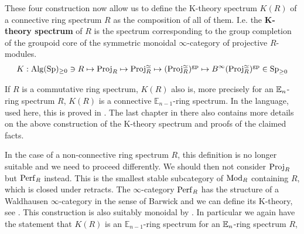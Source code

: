 These four construction now allow us to define the K-theory spectrum $K(R)$ of a connective ring spectrum $R$ as the composition of all of them. I.e. the \textbf{K-theory spectrum} of $R$ is the spectrum corresponding to the group completion of the groupoid core of the symmetric monoidal $\infty$-category of projective $R$-modules. 
\begin{align*}
        K: \operatorname{Alg}(\operatorname{Sp})_{\geq 0}\ni R\mapsto \operatorname{Proj}_R\mapsto \operatorname{Proj}_R^{\simeq}\mapsto (\operatorname{Proj}_R^{\simeq})^{\operatorname{gp}}\mapsto B^{\infty}(\operatorname{Proj}_R^{\simeq})^{\operatorname{gp}}\in \operatorname{Sp}_{\geq 0}
\end{align*}
\begin{rmk}
    If $R$ is a commutative ring spectrum, $K(R)$ also is, more precisely for an $\mathbb{E}_n$-ring spectrum $R$, $K(R)$ is a connective $\mathbb{E}_{n-1}$-ring spectrum. In the language, used here, this is proved in \cite{GGNuniversalityloop}. The last chapter in there also contains more details on the above construction of the K-theory spectrum and proofs of the claimed facts.
\end{rmk}
\begin{rmk}
    In the case of a non-connective ring spectrum $R$, this definition is no longer suitable and we need to proceed differently. We should then not consider $\operatorname{Proj}_R$ but $\operatorname{Perf}_R$ instead. This is the smallest stable subcategory of $\operatorname{Mod}_R$ containing $R$, which is closed under retracts. The $\infty$-category $\operatorname{Perf}_R$ has the structure of a Waldhausen $\infty$-category in the sense of Barwick and we can define its K-theory, see \cite[Chapter~11]{barwickK-theory}. This construction is also suitably monoidal by \cite[Proposition~3.8]{barwick2013multiplicative}. In particular we again have the statement that $K(R)$ is an $\mathbb{E}_{n-1}$-ring spectrum for an $\mathbb{E}_n$-ring spectrum $R$, 
\end{rmk}
